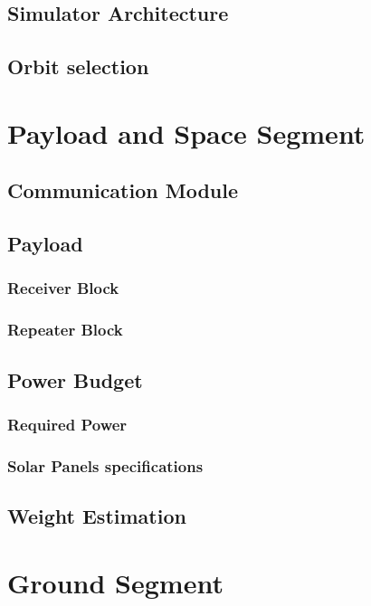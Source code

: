 \documentclass[11pt,a4paper,titlepage]{article}
\begin{document}
	\subsection{Simulator Architecture}\label{sec:simulator}
		
	\subsection{Orbit selection}
		

\section{Payload and Space Segment}
		\lipsum[1]
	\subsection{Communication Module}
		\lipsum[1]
	\subsection{Payload}
		
		\subsubsection{Receiver Block}
			\lipsum[1]
		\subsubsection{Repeater Block}
			\lipsum[1]
	\subsection{Power Budget}
		\subsubsection{Required Power}
			\lipsum[1]
		\subsubsection{Solar Panels specifications}
			\lipsum[1]
	\subsection{Weight Estimation}
		\lipsum[1]

\section{Ground Segment}\label{sec:ground_segment}
	\lipsum[1]
\end{document}

